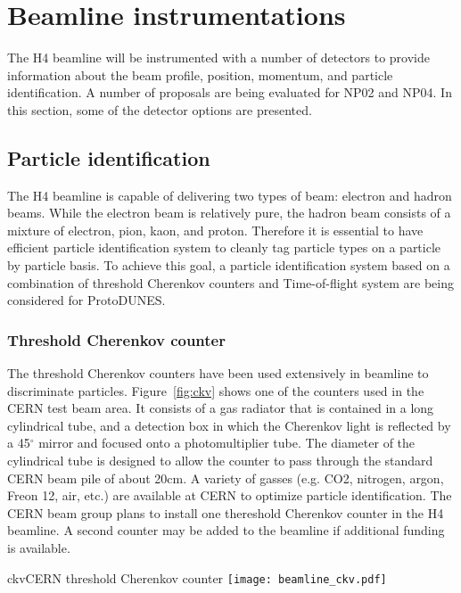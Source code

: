 \section{Beamline instrumentations}
\label{sec:beaminstruments}

The H4 beamline will be instrumented with a number of detectors to provide information about the beam profile, position, momentum, and particle identification. A number of proposals are being evaluated for NP02 and NP04. In this section, some of the detector options are presented.

\subsection{Particle identification}
The H4 beamline is capable of delivering two types of beam: electron and hadron beams. While the electron beam is relatively pure, the hadron beam consists of a mixture of electron, pion, kaon, and proton. Therefore it is essential to have efficient particle identification system to cleanly tag particle types on a particle by particle basis. To achieve this goal, a particle identification system based on a combination of threshold Cherenkov counters and Time-of-flight system are being considered for ProtoDUNES.

\subsubsection{Threshold Cherenkov counter}
The threshold Cherenkov counters have been used extensively in beamline to discriminate particles. Figure~\ref{fig:ckv} shows one of the counters used in the CERN test beam area. It consists of a gas radiator that is contained in a long cylindrical tube, and a detection box in which the Cherenkov light is reflected by a 45$^\circ$ mirror and focused onto a photomultiplier tube. The diameter of the cylindrical tube is designed to allow the counter to pass through the standard CERN beam pile of about 20cm. A variety of gasses (e.g. CO2, nitrogen, argon, Freon 12, air, etc.) are available at CERN to optimize particle identification. The CERN beam group plans to install one thereshold Cherenkov counter in the H4 beamline. A second counter may be added to the beamline if additional funding is available.
\begin{cdrfigure}{ckv}{CERN threshold Cherenkov counter}
  \texttt{[image: beamline\_ckv.pdf]}
\end{cdrfigure}


